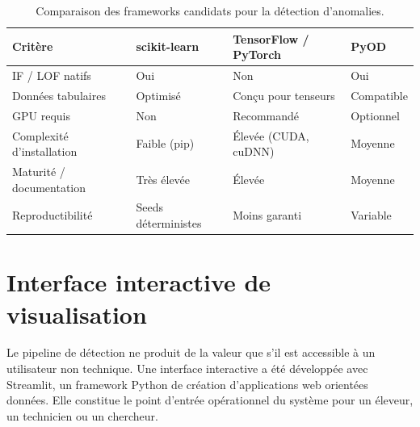 \begin{table}[H]
    \centering
    \caption{Comparaison des frameworks candidats pour la détection d'anomalies.}
    \label{tab:choix_frameworks}
    \begin{tabular}{>{\raggedright\arraybackslash}p{2.5cm}
                    >{\raggedright\arraybackslash}p{3.5cm}
                    >{\raggedright\arraybackslash}p{3.5cm}
                    >{\raggedright\arraybackslash}p{3cm}}
        \toprule
        \textbf{Critère} & \textbf{scikit-learn} & \textbf{TensorFlow / PyTorch}
        & \textbf{PyOD} \\
        \midrule
        IF / LOF natifs & Oui & Non & Oui \\
        \addlinespace
        Données tabulaires & Optimisé & Conçu pour tenseurs & Compatible \\
        \addlinespace
        GPU requis & Non & Recommandé & Optionnel \\
        \addlinespace
        Complexité d'installation & Faible (pip) & Élevée (CUDA, cuDNN) & Moyenne \\
        \addlinespace
        Maturité / documentation & Très élevée & Élevée & Moyenne \\
        \addlinespace
        Reproductibilité & Seeds déterministes & Moins garanti & Variable \\
        \bottomrule
    \end{tabular}
\end{table}

\FloatBarrier
\section{Interface interactive de visualisation}
\label{sec:interface_streamlit}

Le pipeline de détection ne produit de la valeur que s'il est accessible à un utilisateur
non technique. Une interface interactive a été développée avec Streamlit, un framework
Python de création d'applications web orientées données. Elle constitue le point d'entrée
opérationnel du système pour un éleveur, un technicien ou un chercheur.

